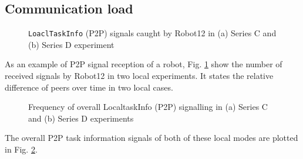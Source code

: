 \subsection*{Communication load}
\begin{figure}[H]
\centering
\hspace*{0.5cm}
\newline
{}
\caption{\small \texttt{LoaclTaskInfo} (P2P) signals caught by Robot12 in (a) Series C and (b) Series D experiment}
\label{fig:local-single-robot-signal} 
\end{figure}
As an example of P2P signal reception of a robot,  Fig. \ref{fig:local-single-robot-signal} show the number of received signals by Robot12 in two local experiments. It states the relative difference of peers over time in two local cases.
\begin{figure}[H]
\centering
\hspace*{0.5cm}
\newline
\centering
{}
\caption{\small Frequency of overall LocaltaskInfo (P2P) signalling in (a) Series C and (b) Series D experiments}
\label{fig:local-signal-frequency-stat} %
\end{figure}
The overall P2P task information signals of both of these local modes are plotted in Fig. \ref{fig:local-signal-frequency-stat}. 
